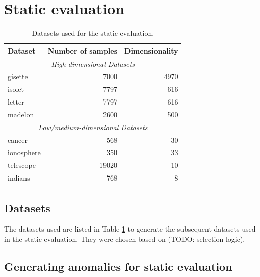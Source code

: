 
\section{Static evaluation}

\begin{table}[h!]
	\centering
	\begin{tabular}{lrr}
	\toprule
	\textbf{Dataset} & \textbf{Number of samples} & \textbf{Dimensionality} \\
	\midrule
	\multicolumn{3}{c}{\textit{High-dimensional Datasets}}\\
	gisette 		& 7000 & 4970	\\
	isolet 			& 7797 & 616	\\
	letter			& 7797 & 616	\\
	madelon 		& 2600 & 500	\\
	\midrule
	\multicolumn{3}{c}{\textit{Low/medium-dimensional Datasets}}\\
	cancer 			& 568      & 30 \\
	ionosphere  & 350      & 33 \\
	telescope   & 19020    & 10 \\
	indians    	& 768      & 8	\\
	\bottomrule
	\end{tabular}
	\caption{Datasets used for the static evaluation.}
	\label{table:datasets}
\end{table}

\subsection{Datasets}

The datasets used are listed in Table \ref{table:datasets} to generate the subsequent datasets used in the static evaluation. They were chosen based on (TODO: selection logic).

\subsection{Generating anomalies for static evaluation}

